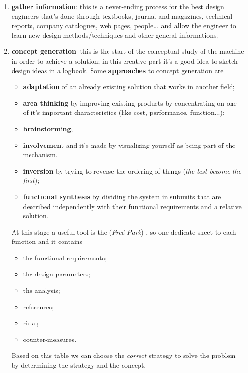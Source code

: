 \begin{enumerate}
		\item \textbf{gather information}: this is a never-ending process for the best design engineers that's done through textbooks, journal and magazines, technical reports, company catalogues, web pages, people... and allow the engineer to learn new design methods/techniques and other general informations;
		
		\item \textbf{concept generation}: this is the start of the conceptual study of the machine in order to achieve a solution; in this creative part it's a good idea to sketch design ideas in a logbook. Some \textbf{approaches} to concept generation are
		\begin{multicols}{2}
		\begin{itemize}
			\item \textbf{adaptation} of an already existing solution that works in another field;
			\item \textbf{area thinking} by improving  existing products by concentrating on one of it's important characteristics (like cost, performance, function...);
			\item \textbf{brainstorming};
			\item \textbf{involvement} and it's made by visualizing yourself as being part of the mechanism.
			\item \textbf{inversion} by trying to reverse the ordering of things (\textit{the last become the first});
			\item \textbf{functional synthesis} by dividing the system in subunits that are described independently with their functional requirements and a relative solution.
		\end{itemize}	
		\end{multicols}
		At this stage a useful tool is the  (\textit{Fred Park}) , so one dedicate sheet to each function and it contains 
		\begin{multicols}{2}
		\begin{itemize}
			\item the functional requirements;
			\item the design parameters;
			\item the analysis;
			\item references;
			\item risks;
			\item counter-measures.
		\end{itemize}
		\end{multicols}
		Based on this table we can choose the \textit{correct} strategy to solve the problem by determining the strategy and the concept.
		

\end{enumerate}
